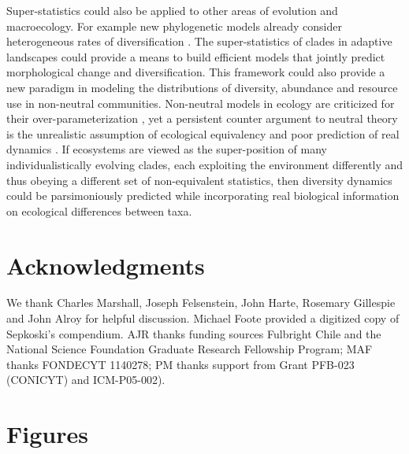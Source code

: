 Super-statistics could also be applied to other areas of evolution and
macroecology.  For example new phylogenetic models already consider
heterogeneous rates of diversification
\citep[e.g.][]{rabosky2006laser}. The super-statistics of clades in
adaptive landscapes could provide a means to build efficient models
that jointly predict morphological change and diversification. This
framework could also provide a new paradigm in modeling the
distributions of diversity, abundance and resource use in non-neutral
communities. Non-neutral models in ecology are criticized for their
over-parameterization \citep{rosindell2011TREE}, yet a persistent
counter argument to neutral theory \citep{hubbell2001} is the
unrealistic assumption of ecological equivalency
\citep{chave2004neutral} and poor prediction of real dynamics
\citep{ricklefs2006neutral}. If ecosystems are viewed as the
super-position of many individualistically evolving clades, each
exploiting the environment differently and thus obeying a different
set of non-equivalent statistics, then diversity dynamics could be
parsimoniously predicted while incorporating real biological
information on ecological differences between taxa.


\section*{Acknowledgments}
We thank Charles Marshall, Joseph Felsenstein, John Harte, Rosemary
Gillespie and John Alroy for helpful discussion. Michael Foote
provided a digitized copy of Sepkoski's compendium. AJR thanks funding
sources Fulbright Chile and the National Science Foundation Graduate
Research Fellowship Program; MAF thanks FONDECYT 1140278; PM thanks
support from Grant PFB-023 (CONICYT) and ICM-P05-002).


\clearpage

\section*{Figures}

